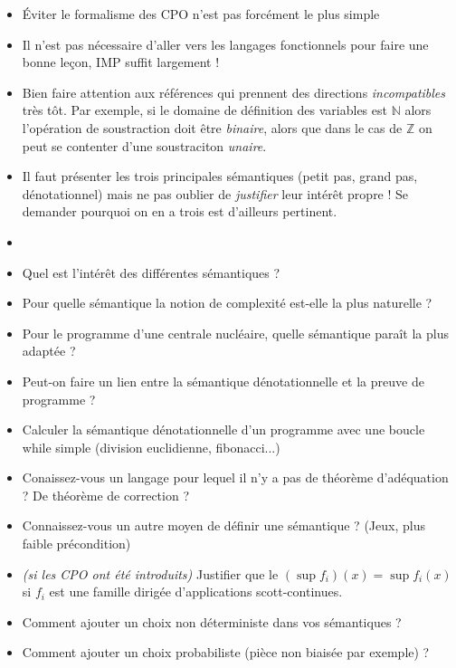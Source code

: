 \documentclass{agregfiche}
\begin{document}
\secidees

\begin{itemize}
    \item Éviter le formalisme des CPO n'est pas forcément le plus simple
\end{itemize}
\secpieges

\begin{itemize}
    \item Il n'est pas nécessaire d'aller vers les langages fonctionnels
        pour faire une bonne leçon, IMP suffit largement !
    \item Bien faire attention aux références qui prennent des directions 
        \emph{incompatibles} très tôt. Par exemple, si le domaine de définition
        des variables est $\mathbb{N}$ alors l'opération de soustraction 
        doit être \emph{binaire}, alors que dans le cas de $\mathbb{Z}$ on peut 
        se contenter d'une soustraciton \emph{unaire}.
    \item Il faut présenter les trois principales sémantiques (petit pas, grand
        pas, dénotationnel) mais ne pas oublier de \emph{justifier} leur intérêt
        propre ! Se demander pourquoi on en a trois est d'ailleurs pertinent.
\end{itemize}


\secquestionsclassiques

\begin{itemize}
    \item {}
    \item Quel est l'intérêt des différentes sémantiques ?
    \item Pour quelle sémantique la notion de complexité est-elle 
        la plus naturelle ?
    \item Pour le programme d'une centrale nucléaire, quelle sémantique 
        paraît la plus adaptée ?
    \item Peut-on faire un lien entre la sémantique dénotationnelle
        et la preuve de programme ?
    \item Calculer la sémantique dénotationnelle d'un programme 
        avec une boucle while simple (division euclidienne, fibonacci...)
    \item Conaissez-vous un langage pour lequel il n'y a pas 
        de théorème d'adéquation ? De théorème de correction ?
    \item Connaissez-vous un autre moyen de définir une sémantique ?
        (Jeux, plus faible précondition)
    \item \emph{(si les CPO ont été introduits)}
        Justifier que le $(\sup f_i) (x) = \sup f_i (x)$
        si $f_i$ est une famille dirigée d'applications 
        scott-continues.
    \item Comment ajouter un choix non déterministe dans 
        vos sémantiques ?
    \item Comment ajouter un choix probabiliste (pièce non biaisée par exemple)
        ?
\end{itemize}
\end{document}
